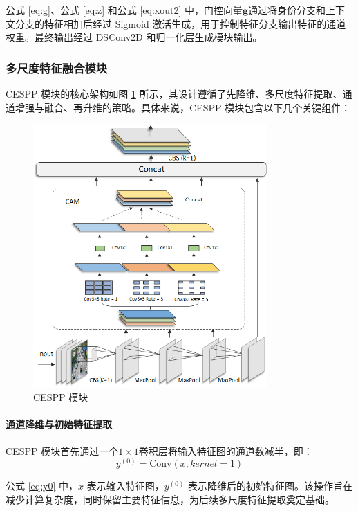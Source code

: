 \documentclass[runningheads]{llncs}
\begin{document}
公式 \ref{eq:g}、公式 \ref{eq:z} 和公式 \ref{eq:xout2} 中，门控向量$\mathbf{g}$通过将身份分支和上下文分支的特征相加后经过 Sigmoid 激活生成，用于控制特征分支输出特征的通道权重。最终输出经过 DSConv2D 和归一化层生成模块输出。

\subsubsection{多尺度特征融合模块}

CESPP 模块的核心架构如图 \ref{fig:CESPP} 所示，其设计遵循了先降维、多尺度特征提取、通道增强与融合、再升维的策略。具体来说，CESPP 模块包含以下几个关键组件：
\begin{figure}[H]
    \centering
    \includegraphics[width=0.8\textwidth]{../figure/SPPC.png}
    \caption{CESPP 模块}
    \label{fig:CESPP}
\end{figure}

\paragraph{通道降维与初始特征提取}

CESPP 模块首先通过一个$1\times1$卷积层将输入特征图的通道数减半，即：
\begin{equation}\label{eq:y0}
    y^{(0)} = \text{Conv}(x, kernel=1)
\end{equation}

公式 \ref{eq:y0} 中，$x$ 表示输入特征图，$y^{(0)}$ 表示降维后的初始特征图。该操作旨在减少计算复杂度，同时保留主要特征信息，为后续多尺度特征提取奠定基础。
\end{document}
